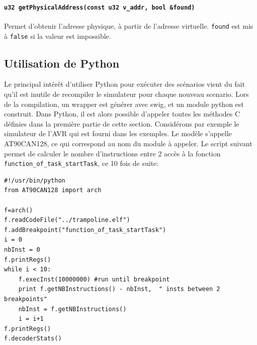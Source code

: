 \paragraph{\texttt{u32 getPhysicalAddress(const u32 v\_addr, bool \&found)}}  Permet d'obtenir l'adresse physique, à partir de l'adresse virtuelle. \texttt{found} est mis à \texttt{false} si la valeur est impossible.

\subsection{Utilisation de Python}
\label{sec:python}
Le principal intérêt d'utiliser Python pour exécuter des scénarios vient du fait qu'il est inutile de recompiler le simulateur pour chaque nouveau scenario. Lors de la compilation, un wrapper est générer avec swig, et un module python est construit. Dans Python, il est alors possible d'appeler toutes les méthodes C définies dans la première partie de cette section. 
Considérons par exemple le simulateur de l'AVR qui est fourni dans les exemples. Le modèle s'appelle AT90CAN128, ce qui correspond au nom du module à appeler. Le script suivant permet de calculer le nombre d'instructions entre 2 accès à la fonction \texttt{function\_of\_task\_startTask}, ce 10 fois de suite:
\lstset{language=Python}
\begin{lstlisting}
#!/usr/bin/python
from AT90CAN128 import arch

f=arch()
f.readCodeFile("../trampoline.elf")
f.addBreakpoint("function_of_task_startTask")
i = 0
nbInst = 0
f.printRegs()
while i < 10:
    f.execInst(10000000) #run until breakpoint
    print f.getNBInstructions() - nbInst,  " insts between 2 breakpoints"
    nbInst = f.getNBInstructions()
    i = i+1
f.printRegs()
f.decoderStats()
\end{lstlisting}
\lstset{language=Harmless}
